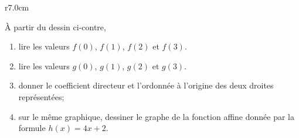 
\begin{exercice}\label{exosmath-0511}

\begin{wrapfigure}{r}{7.0cm}
   \vspace{-0.5cm}        %
   \centering
   
\end{wrapfigure}

À partir du dessin ci-contre,
\begin{enumerate}
    \item
        lire les valeurs \( f(0)\), \( f(1)\), \( f(2)\) et \( f(3)\).
    \item
        lire les valeurs \( g(0)\), \( g(1)\), \( g(2)\) et \( g(3)\).
    \item
        donner le coefficient directeur et l'ordonnée à l'origine des deux droites représentées;
    \item
       sur le même graphique, dessiner le graphe de la fonction affine donnée par la formule \( h(x)=4x+2\).
\end{enumerate}

\end{exercice}
